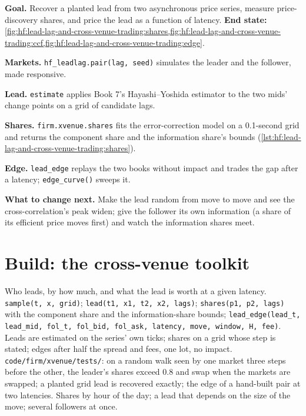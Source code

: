 \begin{tutorial}
\textbf{Goal.} Recover a planted lead from two asynchronous price series, measure price-discovery shares, and price the lead as a function of
latency. \textbf{End state:} \cref{fig:hf:lead-lag-and-cross-venue-trading:shares,fig:hf:lead-lag-and-cross-venue-trading:ccf,fig:hf:lead-lag-and-cross-venue-trading:edge}.
\begin{tutsteps}
\item \textbf{Markets.} \texttt{hf\_leadlag.pair(lag, seed)} simulates the leader and the follower, made responsive.
\item \textbf{Lead.} \texttt{estimate} applies Book 7's Hayashi--Yoshida estimator to the two mids' change points on a grid of candidate lags.
\item \textbf{Shares.} \texttt{firm.xvenue.shares} fits the error-correction model on a 0.1-second grid and returns the component share and the
information share's bounds (\cref{lst:hf:lead-lag-and-cross-venue-trading:shares}).
\label{lst:hf:lead-lag-and-cross-venue-trading:shares}
\item \textbf{Edge.} \texttt{lead\_edge} replays the two books without impact and trades the gap after a latency; \texttt{edge\_curve()} sweeps it.
\label{lst:hf:lead-lag-and-cross-venue-trading:edge}
\end{tutsteps}
\textbf{What to change next.} Make the lead random from move to move and see the cross-correlation's peak widen; give the follower its own
information (a share of its efficient price moves first) and watch the information shares meet.
\end{tutorial}

\section{Build: the cross-venue toolkit}\label{bld:hf:lead-lag-and-cross-venue-trading:xvenue}

\begin{build}
 Who leads, by how much, and what the lead is worth at a given latency.
 \texttt{sample(t, x, grid)}; \texttt{lead(t1, x1, t2, x2, lags)}; \texttt{shares(p1, p2, lags)} with the component share and the
information-share bounds; \texttt{lead\_edge(lead\_t, lead\_mid, fol\_t, fol\_bid, fol\_ask, latency, move, window, H, fee)}.
 Leads are estimated on the series' own ticks; shares on a grid whose step is stated; edges after half the spread and fees, one lot,
no impact.
 \texttt{code/firm/xvenue/tests/}: on a random walk seen by one market three steps before the other, the leader's shares
exceed 0.8 and swap when the markets are swapped; a planted grid lead is recovered exactly; the edge of a hand-built pair at two latencies.
 Shares by hour of the day; a lead that depends on the size of the move; several followers at once.
\end{build}

